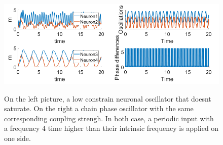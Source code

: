 \documentclass[a4paper]{scrartcl}
\begin{document}
\begin{figure}[!h]
	\centering
	\includegraphics[width=0.5\textwidth]{fig/dd.png}\includegraphics[width=0.5\textwidth]{fig/chao.png}
	\caption{On the left picture, a low constrain neuronal oscillator that doesnt saturate. On the right a chain phase oscillator with the same corresponding coupling strengh. In both case, a periodic input with a frequency 4 time higher than their intrinsic frequency is applied on one side.}\label{dd}
\end{figure}
	
\end{document}
